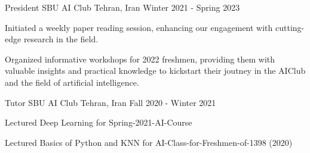 \begin{cventries}

  \cventry%
    {President} %
    {SBU AI Club} %
    {Tehran, Iran} %
    {Winter 2021 - Spring 2023} %
    {%
      \begin{cvitems} %
      	\item {Initiated a weekly paper reading session, enhancing our engagement with cutting-edge research in the field.}
	\item {Organized informative workshops for 2022 freshmen, providing them with valuable insights and practical knowledge to kickstart their joutney in the AIClub and the field of artificial intelligence.}
      \end{cvitems}
    }


  \cventry%
    {Tutor} %
    {SBU AI Club} %
    {Tehran, Iran} %
    {Fall 2020 - Winter 2021} %
    {%
      \begin{cvitems} %
        \item {Lectured Deep Learning for Spring-2021-AI-Course}
        \item {Lectured Basics of Python and KNN for AI-Class-for-Freshmen-of-1398 (2020)}
      \end{cvitems}
    }


\end{cventries}
